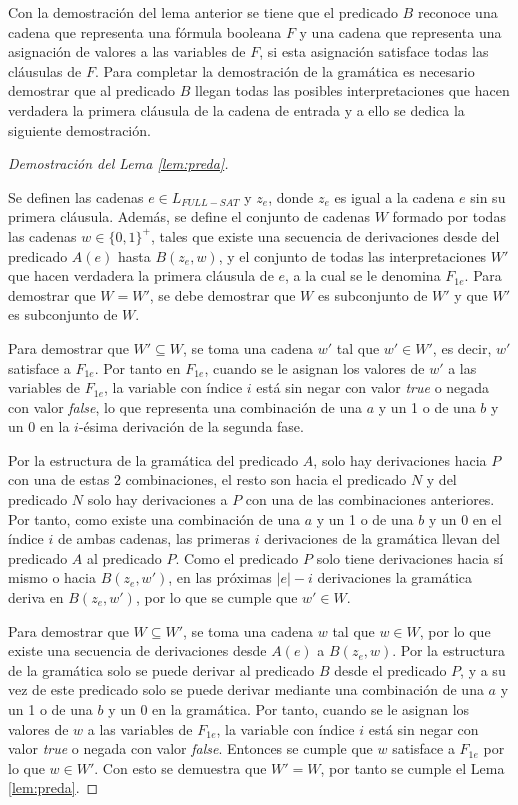 \documentclass[12pt]{article}
\newcommand{\true}{\textit{true}}
\newcommand{\false}{\textit{false}}
\begin{document}
Con la demostración del lema anterior se tiene que el predicado $B$ reconoce una cadena que representa una fórmula booleana $F$
y una cadena que representa una asignación de valores a las variables de $F$, si esta asignación satisface
todas las cláusulas de $F$. Para completar la demostración de la gramática es necesario demostrar
que al predicado $B$ llegan todas las posibles interpretaciones que hacen verdadera la primera cláusula
de la cadena de entrada y a ello se dedica la siguiente demostración.

\begin{proof}[Demostración del Lema \ref{lem:preda}] \
    
    Se definen las cadenas $e\in L_{FULL-SAT}$ y $z_e$, donde $z_e$ es igual a la cadena $e$ sin su primera cláusula.
    Además, se define el conjunto de cadenas $W$ formado por todas las cadenas $w\in \{0,1\}^+$, tales que existe una secuencia de derivaciones desde del predicado $A(e)$ hasta $B(z_e,w)$,
    y el conjunto de todas las interpretaciones $W'$ que hacen verdadera la primera cláusula de $e$, a la cual se le denomina $F_{1e}$.
    Para demostrar que $W=W'$, se debe demostrar que $W$ es subconjunto de $W'$ y que $W'$ es subconjunto de $W$.
    
    Para demostrar que $W'\subseteq W$, se toma una cadena $w'$ tal que $w'\in W'$, es decir, $w'$ satisface a $F_{1e}$.  Por tanto en $F_{1e}$, cuando se le asignan los valores de $w'$ a las variables de $F_{1e}$, la variable  con índice $i$ está sin negar con valor \true{} o negada con valor \false{}, lo que representa una combinación de una $a$ y un 1 o de una $b$ y un 0 en la $i$-ésima derivación de la segunda fase.
    
    Por la estructura de la gramática del predicado $A$, solo hay derivaciones hacia $P$ con una de estas 2 combinaciones, el resto son hacia el predicado $N$ y del predicado $N$ solo hay derivaciones a $P$ con una de las combinaciones anteriores. Por tanto, como existe una combinación de una $a$ y un 1 o de una $b$ y un 0 en el índice $i$ de ambas cadenas, las primeras $i$ derivaciones de la gramática llevan del predicado $A$ al predicado $P$. Como el predicado $P$ solo tiene derivaciones hacia sí mismo o hacia $B(z_e,w')$, en las próximas $|e|-i$ derivaciones la gramática deriva en $B(z_e,w')$, por lo que se cumple que $w'\in W$.
    
    Para demostrar que $W\subseteq W'$, se toma una cadena $w$ tal que $w\in W$, por lo que existe una secuencia de derivaciones desde $A(e)$ a $B(z_e,w)$. Por la estructura de la gramática solo se puede derivar al predicado $B$ desde el predicado $P$, y a su vez de este predicado solo se puede derivar mediante una combinación de una $a$ y un 1 o de una $b$ y un 0 en la gramática. Por tanto, cuando se le asignan los valores de $w$ a las variables de $F_{1e}$, la variable con índice $i$ está sin negar con valor \true{} o negada con valor \false{}.  Entonces se cumple que $w$ satisface a $F_{1e}$ por lo que $w\in W'$. Con esto se demuestra que $W'=W$, por tanto se cumple el Lema \ref{lem:preda}.
\end{proof}
\end{document}
